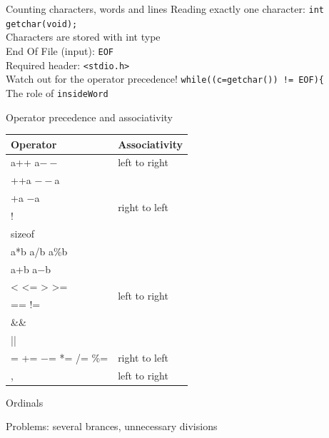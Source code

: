 \documentclass[usenames,dvipsnames,aspectratio=169]{beamer}
\newcommand{\kiemel}[1]{{\color{kiemelesszin}#1}}
\begin{document}
\begin{frame}{Counting characters, words and lines}
  Reading exactly one character: \kiemel{\texttt{int getchar(void);}}\\
  Characters are stored with \kiemel{int} type\\
  End Of File (input): \kiemel{\texttt{EOF}}\\
  Required header: \kiemel{\texttt{<stdio.h>}}\\
  Watch out for the operator precedence! \kiemel{\texttt{while((c=getchar()) != EOF)\{}}\\
  The role of \kiemel{\texttt{insideWord}}
\end{frame}

\begin{frame}{Operator precedence and associativity}
  \begin{center}
    \begin{tabular}{ll}
    Operator & Associativity \\ \hline\hline
    a++ a$--$ & left to right \\ \hline
    ++a $--$a & \multirow{4}{*}{right to left} \\
    +a $-$a & \\
    ! & \\
    sizeof & \\ \hline
    a*b a/b a\%b & \multirow{6}{*}{left to right} \\
    a+b a$-$b & \\
    < <= > >= & \\
    == != & \\
    \&\& & \\
    || & \\ \hline
    = += $-$= *= /= \%= & right to left\\ \hline
    , & left to right \\ \hline
    \end{tabular}
  \end{center}
\end{frame}

\begin{frame}{Ordinals}
    \begin{exampleblock}{}
    \scriptsize
    \vspace{-.3cm}
    
    \vspace{-.3cm}
  \end{exampleblock}
  Problems: several brances, unnecessary divisions
\end{frame}
\end{document}
